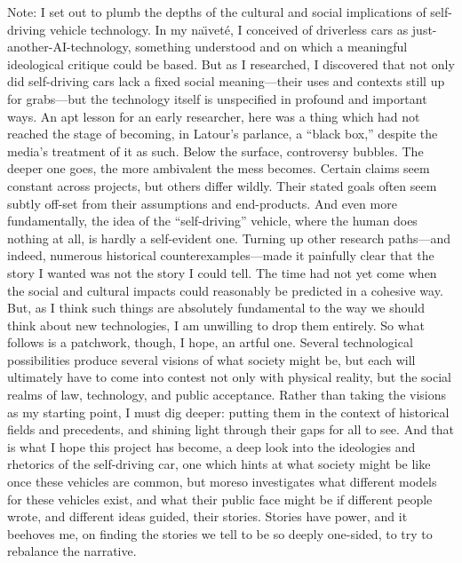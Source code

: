Note: I set out to plumb the depths of the cultural and social
implications of self-driving vehicle technology. In my na\"{\i}vet\'{e}, I
conceived of driverless cars as just-another-AI-technology, something
understood and on which a meaningful ideological critique could be
based. But as I researched, I discovered that not only did
self-driving cars lack a fixed social meaning---their uses and
contexts still up for grabs---but the technology itself is unspecified
in profound and important ways. An apt lesson for an early researcher,
here was a thing which had not reached the stage of becoming, in
Latour's parlance, a ``black box,'' despite the media's treatment of
it as such. Below the surface, controversy bubbles. The deeper one
goes, the more ambivalent the mess becomes. Certain claims seem
constant across projects, but others differ wildly. Their stated goals
often seem subtly off-set from their assumptions and end-products. And
even more fundamentally, the idea of the ``self-driving'' vehicle,
where the human does nothing at all, is hardly a self-evident one.
Turning up other research paths---and indeed, numerous historical
counterexamples---made it painfully clear that the story I wanted was
not the story I could tell. The time had not yet come when the social
and cultural impacts could reasonably be predicted in a cohesive way.
But, as I think such things are absolutely fundamental to the way we
should think about new technologies, I am unwilling to drop them
entirely. So what follows is a patchwork, though, I hope, an artful
one. Several technological possibilities produce several visions of
what society might be, but each will ultimately have to come into
contest not only with physical reality, but the social realms of law,
technology, and public acceptance. Rather than taking the visions as
my starting point, I must dig deeper: putting them in the context of
historical fields and precedents, and shining light through their gaps
for all to see. And that is what I hope this project has become, a
deep look into the ideologies and rhetorics of the self-driving car,
one which hints at what society might be like once these
vehicles are common, but moreso investigates what different models for these vehicles
exist, and what their public face might be if different people wrote,
and different ideas guided, their stories. Stories have power, and it
beehoves me, on finding the stories we tell to be so deeply one-sided,
to try to rebalance the narrative.
